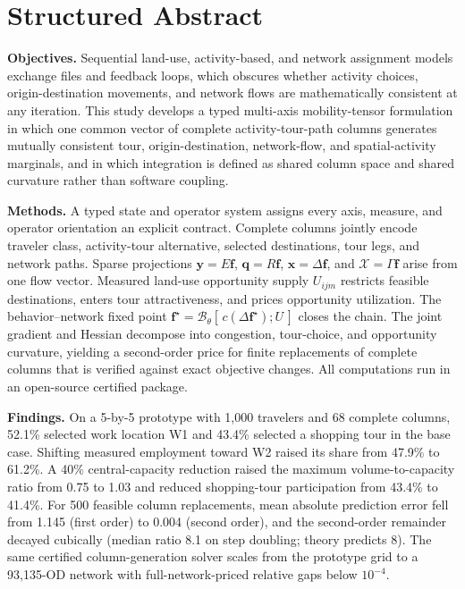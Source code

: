 \documentclass[10pt]{article}
\newcommand{\vect}[1]{\boldsymbol{#1}}
\newcommand{\Beh}{\mathcal{B}_{\theta}}
\begin{document}
\newpage
\section*{Structured Abstract}

\textbf{Objectives.}
Sequential land-use, activity-based, and network assignment models exchange files and feedback loops, which obscures whether activity choices, origin-destination movements, and network flows are mathematically consistent at any iteration. This study develops a typed multi-axis mobility-tensor formulation in which one common vector of complete activity-tour-path columns generates mutually consistent tour, origin-destination, network-flow, and spatial-activity marginals, and in which integration is defined as shared column space and shared curvature rather than software coupling.

\textbf{Methods.}
A typed state and operator system assigns every axis, measure, and operator orientation an explicit contract. Complete columns jointly encode traveler class, activity-tour alternative, selected destinations, tour legs, and network paths. Sparse projections $\vect y=E\vect f$, $\vect q=R\vect f$, $\vect x=\Delta\vect f$, and $\mathcal X=\Gamma\vect f$ arise from one flow vector. Measured land-use opportunity supply $U_{ijm}$ restricts feasible destinations, enters tour attractiveness, and prices opportunity utilization. The behavior--network fixed point $\vect f^{\star}=\Beh[\,c(\Delta\vect f^{\star});U\,]$ closes the chain. The joint gradient and Hessian decompose into congestion, tour-choice, and opportunity curvature, yielding a second-order price for finite replacements of complete columns that is verified against exact objective changes. All computations run in an open-source certified package.

\textbf{Findings.}
On a 5-by-5 prototype with 1,000 travelers and 68 complete columns, 52.1\% selected work location W1 and 43.4\% selected a shopping tour in the base case. Shifting measured employment toward W2 raised its share from 47.9\% to 61.2\%. A 40\% central-capacity reduction raised the maximum volume-to-capacity ratio from 0.75 to 1.03 and reduced shopping-tour participation from 43.4\% to 41.4\%. For 500 feasible column replacements, mean absolute prediction error fell from 1.145 (first order) to 0.004 (second order), and the second-order remainder decayed cubically (median ratio 8.1 on step doubling; theory predicts 8). The same certified column-generation solver scales from the prototype grid to a 93,135-OD network with full-network-priced relative gaps below $10^{-4}$.
\end{document}
